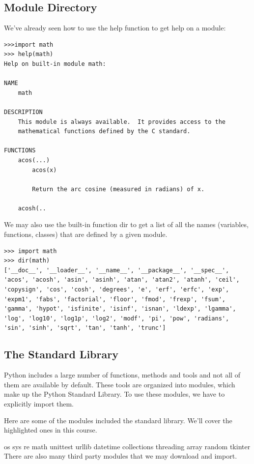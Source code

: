 \documentclass{article}
\begin{document}
\subsection{Module Directory}
We’ve already seen how to use the help function to get help on a module:

\begin{lstlisting}
>>>import math
>>> help(math)
Help on built-in module math:
 
NAME
    math
 
DESCRIPTION
    This module is always available.  It provides access to the
    mathematical functions defined by the C standard.
 
FUNCTIONS
    acos(...)
        acos(x)
        
        Return the arc cosine (measured in radians) of x.
    
    acosh(..
\end{lstlisting}
 
We may also use the built-in function dir to get a list of all the names (variables, functions, classes) that are defined by a given module. 

\begin{lstlisting}
>>> import math
>>> dir(math)
['__doc__', '__loader__', '__name__', '__package__', '__spec__', 'acos', 'acosh', 'asin', 'asinh', 'atan', 'atan2', 'atanh', 'ceil', 'copysign', 'cos', 'cosh', 'degrees', 'e', 'erf', 'erfc', 'exp', 'expm1', 'fabs', 'factorial', 'floor', 'fmod', 'frexp', 'fsum', 'gamma', 'hypot', 'isfinite', 'isinf', 'isnan', 'ldexp', 'lgamma', 'log', 'log10', 'log1p', 'log2', 'modf', 'pi', 'pow', 'radians', 'sin', 'sinh', 'sqrt', 'tan', 'tanh', 'trunc']
\end{lstlisting}

\subsection{The Standard Library}
Python includes a large number of functions, methods and tools and not all of them are available by default. These tools are organized into modules, which make up the Python Standard Library. To use these modules, we have to explicitly import them. 

Here are some of the modules included the standard library. We'll cover the highlighted ones in this course. 

os 
sys
re
math
unittest
urllib
datetime
collections
threading
array
random
tkinter
There are also many third party modules that we may download and import.
\end{document}
